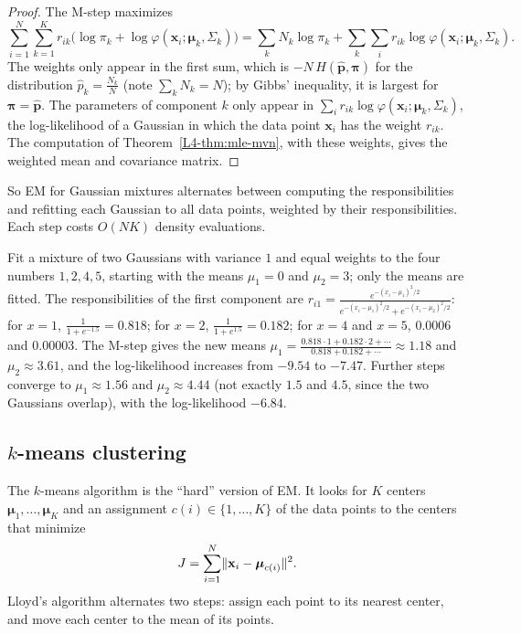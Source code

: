 \begin{proof}
    The M-step maximizes
    \[\sum_{i=1}^N\sum_{k=1}^K r_{ik}\big(\log\pi_k + \log\varphi(\mathbf{x}_i; \boldsymbol{\mu}_k, \Sigma_k)\big) = \sum_k N_k\log\pi_k + \sum_k\sum_i r_{ik}\log\varphi(\mathbf{x}_i; \boldsymbol{\mu}_k, \Sigma_k).\]
    The weights only appear in the first sum, which is $-N\,H(\hat{\mathbf{p}}, \boldsymbol{\pi})$ for the distribution $\hat p_k = \frac{N_k}{N}$ (note $\sum_k N_k = N$); by Gibbs' inequality, it is largest for $\boldsymbol{\pi} = \hat{\mathbf{p}}$. The parameters of component $k$ only appear in $\sum_i r_{ik}\log\varphi(\mathbf{x}_i; \boldsymbol{\mu}_k, \Sigma_k)$, the log-likelihood of a Gaussian in which the data point $\mathbf{x}_i$ has the weight $r_{ik}$. The computation of Theorem~\ref{L4-thm:mle-mvn}, with these weights, gives the weighted mean and covariance matrix.
\end{proof}

So EM for Gaussian mixtures alternates between computing the responsibilities and refitting each Gaussian to all data points, weighted by their responsibilities. Each step costs $O(NK)$ density evaluations.

\begin{example}\label{L4-ex:em}
    Fit a mixture of two Gaussians with variance $1$ and equal weights to the four numbers $1, 2, 4, 5$, starting with the means $\mu_1 = 0$ and $\mu_2 = 3$; only the means are fitted. The responsibilities of the first component are $r_{i1} = \frac{e^{-(x_i - \mu_1)^2/2}}{e^{-(x_i - \mu_1)^2/2} + e^{-(x_i - \mu_2)^2/2}}$: for $x = 1$, $\frac{1}{1 + e^{-1.5}} = 0.818$; for $x = 2$, $\frac{1}{1 + e^{1.5}} = 0.182$; for $x = 4$ and $x = 5$, $0.0006$ and $0.00003$. The M-step gives the new means $\mu_1 = \frac{0.818 \cdot 1 + 0.182 \cdot 2 + \cdots}{0.818 + 0.182 + \cdots} \approx 1.18$ and $\mu_2 \approx 3.61$, and the log-likelihood increases from $-9.54$ to $-7.47$. Further steps converge to $\mu_1 \approx 1.56$ and $\mu_2 \approx 4.44$ (not exactly $1.5$ and $4.5$, since the two Gaussians overlap), with the log-likelihood $-6.84$.
\end{example}

\subsection{\texorpdfstring{$k$}{k}-means clustering}

The $k$-means algorithm is the ``hard'' version of EM. It looks for $K$ centers $\boldsymbol{\mu}_1, \ldots, \boldsymbol{\mu}_K$ and an assignment $c(i) \in \{1, \ldots, K\}$ of the data points to the centers that minimize
\[J = \sum_{i=1}^N \lVert \mathbf{x}_i - \boldsymbol{\mu}_{c(i)} \rVert^2.\]
Lloyd's algorithm alternates two steps: assign each point to its nearest center, and move each center to the mean of its points.

